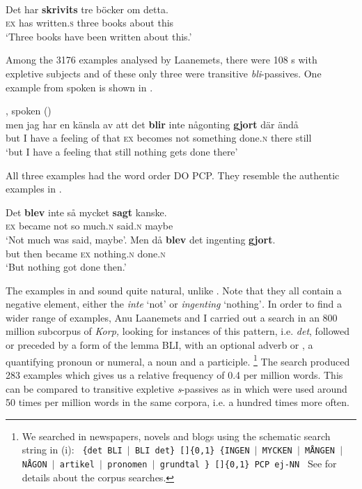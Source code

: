 \documentclass[output=paper]{LSP/langsci}
\begin{document}
\ea%
    \label{ex:engdahl:7}
    \\
\gll Det   har   \textbf{skrivits}     tre  böcker   om     detta.\\
     \textsc{ex} has    written.\textsc{s}    three    books    about  this\\
     \glt ‘Three books have been written about this.'
\z

Among the 3176   examples analysed by Laanemets, there were 108 s with expletive subjects and of these only three were transitive \textit{bli}{}-passives. One example from spoken  is shown in .

\ea%
    \label{ex:engdahl:8}
    , spoken (\citealt{Laanemets2012})\\
\gll men jag har   en   känsla   av att det \textbf{blir}  inte   någonting \textbf{gjort}  där   ändå \\
     but   I    have  a    feeling    of that \textsc{ex} becomes not something done\textsc{.n} there still\\
    \glt ‘but I have a feeling that  still nothing gets done there’
\z

\noindent All three examples had the word order DO PCP. They resemble the authentic examples in .

\ea%
    \label{ex:engdahl:9}
     \citep[31]{Engdahl1999}
\ea
\gll Det \textbf{blev}     inte   så mycket \textbf{sagt}     kanske.\\
     \textsc{ex} became not so  much\textsc{.n}   said\textsc{.n}   maybe\\
     \glt ‘Not much was  said, maybe'.
\ex
\gll     Men då     \textbf{blev}  det   ingenting    \textbf{gjort}.\\
    but    then  became \textsc{ex}     nothing\textsc{.n}      done\textsc{.n}\\
    \glt ‘But nothing got done then.'
\z
\z

\noindent The examples in  and  sound quite natural, unlike . Note that they all contain a negative element, either the  \textit{inte} ‘not’ or \textit{ingenting} ‘nothing’\textit{.} In order to find a wider range of examples, Anu Laanemets and I carried out a search in an 800 million subcorpus of \textit{Korp,} looking for instances of this pattern, i.e. \textit{det}, followed or preceded by a form of the lemma BLI, with an optional adverb or , a quantifying pronoun or numeral, a noun and a participle.%
\footnote{We searched in newspapers, novels and blogs using the schematic search string in (i):
\ea%
\texttt{%
\{det BLI $\mid$ BLI det\}  []\{0,1\} \{INGEN  $\mid$ MYCKEN  $\mid$ MÅNGEN  $\mid$ NÅGON  $\mid$ artikel  $\mid$ pronomen  $\mid$ grundtal \} []\{0,1\} PCP ej-NN
}
\z
See \citet{EngdahLaanemetsl2015opersonlig} for details about the corpus searches.
}
The search produced 283 examples which gives us a relative frequency of 0.4 per million words. This can be compared to transitive expletive \textit{s}{}-passives as in  which were used around 50 times per million words in the same corpora, i.e. a hundred times more often. 
\end{document}
